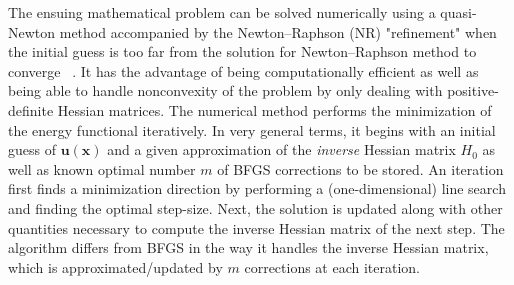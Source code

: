 \documentclass[aps,
superscriptaddress,notitlepage]{revtex4-1}
\begin{document}
The ensuing mathematical  problem can be solved numerically using  a quasi-Newton method accompanied by the Newton–Raphson (NR) "refinement" when the initial guess is too far from the solution for Newton–Raphson method to converge  ~\cite{Tadmor1996-qi}. It has the advantage of being computationally efficient as well as being able to handle nonconvexity of the problem by only dealing with positive-definite Hessian matrices. The numerical method performs the minimization of the energy functional  iteratively. In very general terms, it begins with an initial guess of $\boldsymbol{u}(\boldsymbol{x})$ and a given approximation of the \textit{inverse} Hessian matrix $H_0$ as well as known optimal  number $m$ of BFGS corrections to be stored. An iteration first finds a minimization direction by performing a (one-dimensional) line search and finding the optimal step-size. Next, the solution is updated along with other quantities necessary to compute the inverse Hessian matrix of the next step.  The algorithm differs from BFGS in the way it handles the inverse Hessian matrix, which is approximated/updated by $m$ corrections at each iteration.
\end{document}
